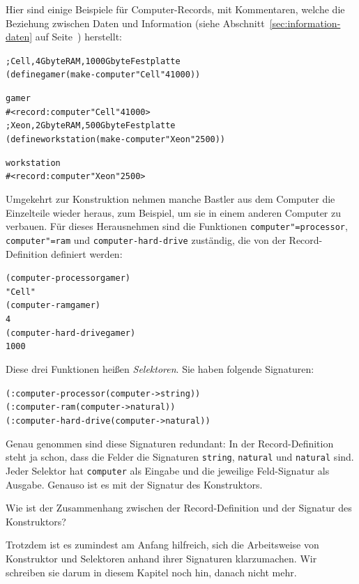 Hier sind einige Beispiele für Computer-Records, mit Kommentaren,
welche die Beziehung zwischen Daten und Information (siehe
Abschnitt~\ref{sec:information-daten} auf
Seite~\pageref{sec:information-daten}) herstellt:
%
\begin{alltt}
; Cell, 4 Gbyte RAM, 1000 Gbyte Festplatte
(define gamer (make-computer "Cell" 4 1000))

gamer
\evalsto{} #<record:computer "Cell" 4 1000>
; Xeon, 2 Gbyte RAM, 500 Gbyte Festplatte
(define workstation (make-computer "Xeon" 2 500))

workstation
\evalsto{} #<record:computer "Xeon" 2 500>
\end{alltt}
%
Umgekehrt zur Konstruktion nehmen manche Bastler aus dem Computer die
Einzelteile wieder heraus, zum Beispiel, um sie in einem anderen
Computer zu verbauen. Für dieses Herausnehmen sind die Funktionen
\texttt{computer"=processor}, \texttt{computer"=ram} und
\texttt{computer-hard-drive} zuständig, die von der
Record-Definition definiert werden:
%
\begin{alltt}
(computer-processor gamer)
\evalsto{} "Cell"
(computer-ram gamer)
\evalsto{} 4
(computer-hard-drive gamer)
\evalsto{} 1000
\end{alltt}
%
Diese drei Funktionen heißen \textit{Selektoren}.  Sie haben
folgende Signaturen:
%
\begin{alltt}
(: computer-processor (computer -> string))
(: computer-ram (computer -> natural))
(: computer-hard-drive (computer -> natural))
\end{alltt}
%
Genau genommen sind diese Signaturen redundant: In der
Record-Definition steht ja schon, dass die Felder die Signaturen
\texttt{string}, \texttt{natural} und \texttt{natural} sind.  Jeder
Selektor hat \texttt{computer} als Eingabe und die jeweilige
Feld-Signatur als Ausgabe.  Genauso ist es mit der Signatur des
Konstruktors.
%
\begin{aufgabeinline}
  Wie ist der Zusammenhang zwischen der Record-Definition und der
  Signatur des Konstruktors?
\end{aufgabeinline}
%
Trotzdem ist es zumindest am Anfang hilfreich, sich die Arbeitsweise
von Konstruktor und Selektoren anhand ihrer Signaturen klarzumachen.
Wir schreiben sie darum in diesem Kapitel noch hin, danach nicht mehr.

